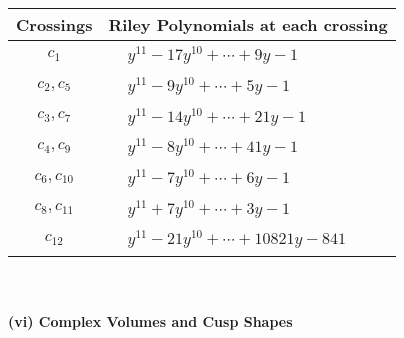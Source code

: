 \documentclass[1p]{elsarticle_modified}
\theoremstyle{definition}
\begin{document}
\begin{tabular}{m{50pt}|m{274pt}}
Crossings & \hspace{64pt}Riley Polynomials at each crossing \\
\hline $$\begin{aligned}c_{1}\end{aligned}$$&$\begin{aligned}
&y^{11}-17 y^{10}+\cdots+9 y-1
\end{aligned}$\\
\hline $$\begin{aligned}c_{2},c_{5}\end{aligned}$$&$\begin{aligned}
&y^{11}-9 y^{10}+\cdots+5 y-1
\end{aligned}$\\
\hline $$\begin{aligned}c_{3},c_{7}\end{aligned}$$&$\begin{aligned}
&y^{11}-14 y^{10}+\cdots+21 y-1
\end{aligned}$\\
\hline $$\begin{aligned}c_{4},c_{9}\end{aligned}$$&$\begin{aligned}
&y^{11}-8 y^{10}+\cdots+41 y-1
\end{aligned}$\\
\hline $$\begin{aligned}c_{6},c_{10}\end{aligned}$$&$\begin{aligned}
&y^{11}-7 y^{10}+\cdots+6 y-1
\end{aligned}$\\
\hline $$\begin{aligned}c_{8},c_{11}\end{aligned}$$&$\begin{aligned}
&y^{11}+7 y^{10}+\cdots+3 y-1
\end{aligned}$\\
\hline $$\begin{aligned}c_{12}\end{aligned}$$&$\begin{aligned}
&y^{11}-21 y^{10}+\cdots+10821 y-841
\end{aligned}$\\
\hline
\end{tabular}\\~\\
\newpage\flushleft \textbf{(vi) Complex Volumes and Cusp Shapes}
\end{document}
